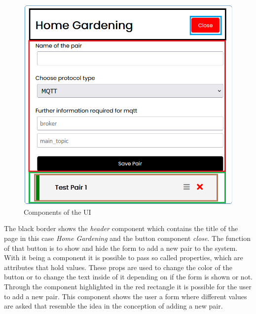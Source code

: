 \begin{figure}
    \centering
     \begin{minipage}[b]{0.5\textwidth}
         \centering
         \includegraphics[width=\textwidth]{images/4_3/components.png}
         \caption{Components of the UI}
         \label{fig:components}
     \end{minipage}
     \vspace{-.25\baselineskip}
\end{figure}

The black border shows the \textit{header} component which contains the title of the page in this case \textit{Home Gardening} and the button component \textit{close}. The function of that button is to show and hide the form to add a new pair to the system. \\

With it being a component it is possible to pass so called properties, which are attributes that hold values. These props are used to change the color of the button or to change the text inside of it depending on if the form is shown or not. \\

Through the component highlighted in the red rectangle it is possible for the user to add a new pair. This component shows the user a form where different values are asked that resemble the idea in the conception of adding a new pair. \\

